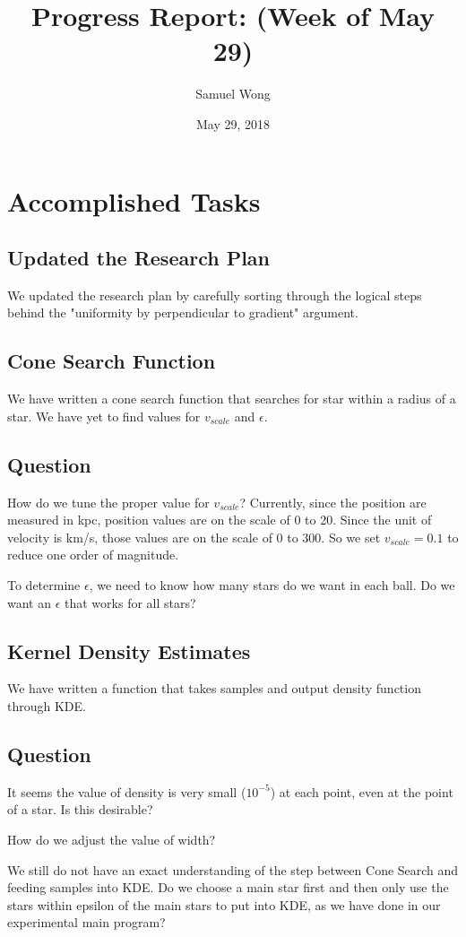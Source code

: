 \documentclass[12pt]{article}
\begin{document}
\title{Progress Report: (Week of May 29)}
\author{Samuel Wong}
\date{May 29, 2018}
\maketitle


\section{Accomplished Tasks}
\subsection{Updated the Research Plan}
We updated the research plan by carefully sorting through the logical steps behind the "uniformity by perpendicular to gradient" argument.
\subsection{Cone Search Function}
We have written a cone search function that searches for star within a radius of a star. We have yet to find values for $v_{scale}$ and $\epsilon$.
\subsection*{Question}
How do we tune the proper value for $v_{scale}$? Currently, since the position are measured in kpc, position values are on the scale of 0 to 20.
Since the unit of velocity is km/s, those values are on the scale of 0 to 300. So we set $v_{scale} = 0.1$ to reduce one order of magnitude.

To determine $\epsilon$, we need to know how many stars do we want in each ball. Do we want an $\epsilon$ that works for all stars?
\subsection{Kernel Density Estimates}
We have written a function that takes samples and output density function through KDE.
\subsection*{Question}
It seems the value of density is very small ($10^{-5}$) at each point, even at the point of a star. Is this desirable?

How do we adjust the value of width?

We still do not have an exact understanding of the step between Cone Search and feeding samples into KDE. Do we choose a main star first and then only use the stars within epsilon of the main stars to put into KDE, as we have done in our experimental main program?
\end{document}
